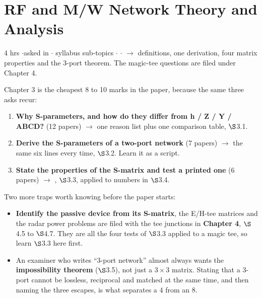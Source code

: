 \section{RF and M/W Network Theory and Analysis}
{\color{sub}\footnotesize 4 hrs \gap$\cdot$\gap asked in 
\gap$\cdot$ syllabus sub-topics \gap$\cdot$\gap {} \gap$\cdot$\gap {}
$\rightarrow$ definitions, one derivation, four matrix properties and the 3-port theorem.
The magic-tee questions are filed under Chapter 4.}

\vspace{3pt}\noindent
\colorbox{gdL}{\makebox[\dimexpr\textwidth-2\fboxsep][l]{%
  \textcolor{gd}{\bfseries\footnotesize READ THIS FIRST}}}
\par\nobreak\vspace{3pt}

Chapter 3 is the cheapest 8 to 10 marks in the paper, because the same three asks recur:
\begin{enumerate}[label=\arabic*., leftmargin=1.4em, itemsep=1pt]
  \item \textbf{Why S-parameters, and how do they differ from h / Z / Y / ABCD?}
    (12 papers) $\rightarrow$ one reason list plus one comparison table, $\S$3.1.
  \item \textbf{Derive the S-parameters of a two-port network} (7 papers)
    $\rightarrow$ the same six lines every time, $\S$3.2. Learn it as a script.
  \item \textbf{State the properties of the S-matrix and test a printed one} (6 papers)
    $\rightarrow$ , $\S$3.3, applied to numbers in
    $\S$3.4.
\end{enumerate}
Two more traps worth knowing before the paper starts:
\begin{itemize}
  \item \textbf{Identify the passive device from its S-matrix}, the E/H-tee matrices and
    the radar power problems are filed with the tee junctions in \textbf{Chapter 4},
    $\S$4.5 to $\S$4.7. They are all the four tests of $\S$3.3 applied to a magic tee, so
    learn $\S$3.3 here first.
  \item An examiner who writes ``3-port network'' almost always wants the
    \textbf{impossibility theorem} ($\S$3.5), not just a $3\times3$ matrix. Stating that a
    3-port cannot be lossless, reciprocal and matched at the same time, and then naming the
    three escapes, is what separates a 4 from an 8.
\end{itemize}

